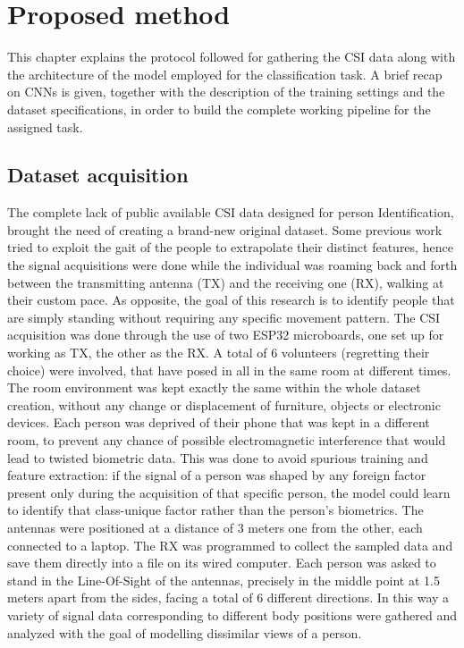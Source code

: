 \documentclass[binding=0.7cm, oneside]{sapthesis}
\begin{document}
\chapter{Proposed method}
This chapter explains the protocol followed for gathering the CSI data along with the architecture of the model employed for the classification task. A brief recap on CNNs is given, together with the description of the training settings and the dataset specifications, in order to build the complete working pipeline for the assigned task.
\section{Dataset acquisition}
The complete lack of public available CSI data designed for person Identification, brought the need of creating a brand-new original dataset. Some previous work \cite{WiWho_gait_decisionTree} tried to exploit the gait of the people to extrapolate their distinct features, hence the signal acquisitions
were done while the individual was roaming back and forth between the transmitting antenna (TX) and the receiving one (RX), walking at their custom pace. As opposite, the goal of this research is to identify people that are simply standing without requiring any specific movement pattern.
The CSI acquisition was done through the use of two ESP32 microboards, one set up for working as TX, the other as the RX. A total of 6 volunteers (regretting their choice) were involved, that have posed in all in the same room at different times. The room environment was kept exactly the same within the
whole dataset creation, without any change or displacement of furniture, objects or electronic devices. Each person was deprived of their phone that was kept in a different room, to prevent any chance of possible electromagnetic interference that would lead to twisted biometric data.
This was done to avoid spurious training and feature extraction: if the signal of a person was shaped by any foreign factor present only during the acquisition of that specific person, the model could learn to identify that class-unique factor rather than the person's biometrics.
The antennas were positioned at a distance of 3 meters one from the other, each connected to a laptop. The RX was programmed to collect the sampled data and save them directly into a file on its wired computer. Each person was asked to stand in the Line-Of-Sight of the antennas, precisely in the middle
point at 1.5 meters apart from the sides, facing a total of 6 different directions. In this way a variety of signal data corresponding to different body positions were gathered and analyzed with the goal of modelling dissimilar views of a person.
\end{document}
